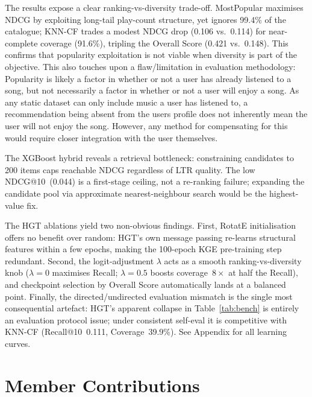 \documentclass[10pt,twocolumn,letterpaper]{article}
\begin{document}
The results expose a clear ranking-vs-diversity trade-off. MostPopular maximises NDCG by exploiting long-tail play-count structure, yet ignores 99.4\% of the catalogue; KNN-CF trades a modest NDCG drop (0.106 vs.\ 0.114) for near-complete coverage (91.6\%), tripling the Overall Score (0.421 vs.\ 0.148). This confirms that popularity exploitation is not viable when diversity is part of the objective. This also touches upon a flaw/limitation in evaluation methodology: Popularity is likely a factor in whether or not a user has already listened to a song, but not necessarily a factor in whether or not a user will enjoy a song. As any static dataset can only include music a user has listened to, a recommendation being absent from the users profile does not inherently mean the user will not enjoy the song. However, any method for compensating for this would require closer integration with the user themselves.

The XGBoost hybrid reveals a retrieval bottleneck: constraining candidates to 200 items caps reachable NDCG regardless of LTR quality. The low NDCG@10~(0.044) is a first-stage ceiling, not a re-ranking failure; expanding the candidate pool via approximate nearest-neighbour search would be the highest-value fix.

The HGT ablations yield two non-obvious findings. First, RotatE initialisation offers no benefit over random: HGT's own message passing re-learns structural features within a few epochs, making the 100-epoch KGE pre-training step redundant. Second, the logit-adjustment $\lambda$ acts as a smooth ranking-vs-diversity knob ($\lambda{=}0$ maximises Recall; $\lambda{=}0.5$ boosts coverage~$8\times$ at half the Recall), and checkpoint selection by Overall Score automatically lands at a balanced point. Finally, the directed/undirected evaluation mismatch is the single most consequential artefact: HGT's apparent collapse in Table~\ref{tab:bench} is entirely an evaluation protocol issue; under consistent self-eval it is competitive with KNN-CF (Recall@10~0.111, Coverage~39.9\%). See Appendix for all learning curves.

\section{Member Contributions}
\label{sec:contributions}
\end{document}
